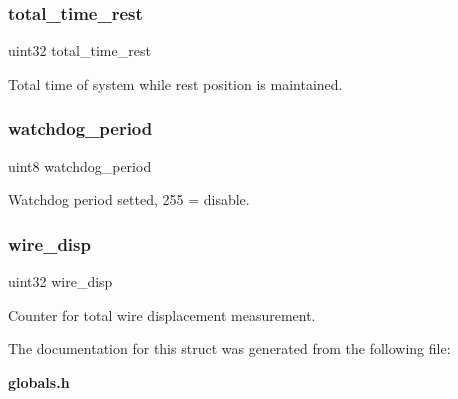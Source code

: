 \subsubsection{total\+\_\+time\+\_\+rest}
{\footnotesize\ttfamily uint32 total\+\_\+time\+\_\+rest}

Total time of system while rest position is maintained. \mbox{\label{structst__mem_a1aae70aad54a04c7b41a8d2dcd7aba14}} 
\subsubsection{watchdog\+\_\+period}
{\footnotesize\ttfamily uint8 watchdog\+\_\+period}

Watchdog period setted, 255 = disable. \mbox{\label{structst__mem_a0286ab74bf93202e73bd343c1d340e42}} 
\subsubsection{wire\+\_\+disp}
{\footnotesize\ttfamily uint32 wire\+\_\+disp}

Counter for total wire displacement measurement. 

The documentation for this struct was generated from the following file\+:\begin{DoxyCompactItemize}
\item 
\textbf{ globals.\+h}\end{DoxyCompactItemize}
